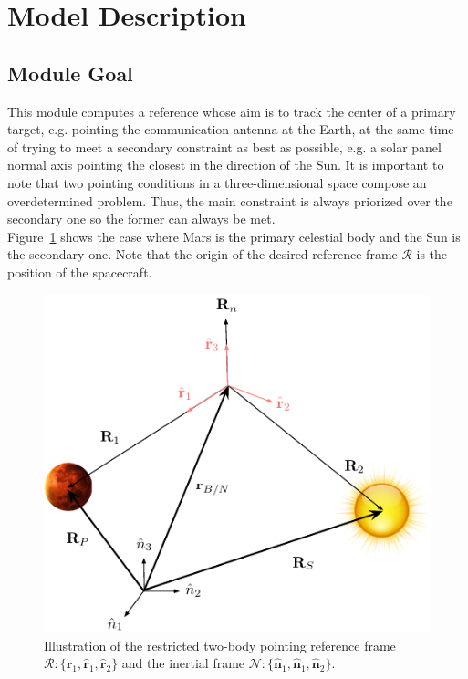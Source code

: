 
\section{Model Description}


\subsection{Module Goal}
This module computes a reference whose aim is to track the center of a primary target, e.g. pointing the communication antenna at the Earth, at the same time of trying to meet a secondary constraint as best as possible, e.g. a solar panel normal axis pointing the closest in the direction of the Sun.  It is important to note that two pointing conditions in a three-dimensional space compose an overdetermined problem. Thus, the main constraint is always priorized over the secondary one so the former can always be met.\\
Figure~\ref{fig:fig1} shows the case where Mars is the primary celestial body and the Sun is the secondary one. Note that the origin of the desired reference frame $\mathcal{R}$ is the position of the spacecraft.
\begin{figure}[htb]
	\centerline{
	\includegraphics[]{Figures/fig1.pdf}
	}
	\caption{Illustration of the restricted two-body pointing reference frame $\mathcal{R}:\{ \hat{\bm r}_{1},\hat{\bm r}_{1}, \hat{\bm r}_{2} \}$ and the inertial frame $\mathcal{N}:\{ \hat{\bm n}_{1},\hat{\bm n}_{1}, \hat{\bm n}_{2} \}$.}
	\label{fig:fig1}
\end{figure}

